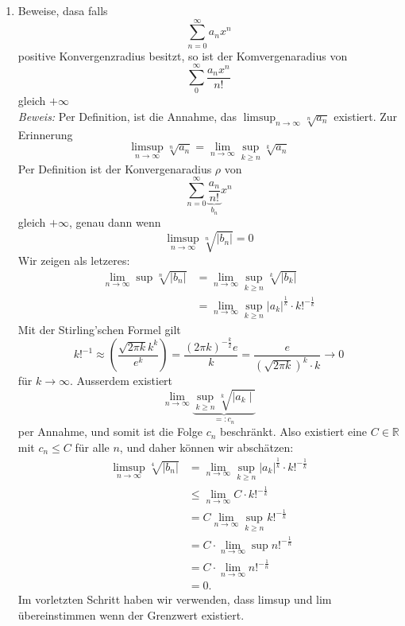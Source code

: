 \documentclass[a4paper,8pt]{extarticle}
\begin{document}
\begin{enumerate}
\item Beweise, dasa falls
$$
\sum_{n=0}^\infty a_nx^n
$$
positive Konvergenzradius besitzt, so ist der Komvergenaradius von
$$
\sum_{0}^{\infty} \frac{a_{n} x^{n}}{n !}
$$
gleich $+\infty$ \\
\textit{Beweis:} Per Definition, ist die Annahme, das $\limsup_{n \to \infty} \sqrt[n]{a_n}$
existiert. Zur Erinnerung
$$\limsup_{n \to \infty} \sqrt[n]{a_n} = \lim_{n \to \infty} \sup_{k \geq n} \sqrt[k]{a_n}$$
Per Definition ist der Konvergenaradius $\rho$ von
$$
\sum_{n=0}^{\infty} \underbrace{\frac{a_{n}}{n !}}_{b_{n}} x^{n}
$$
gleich $+\infty$, genau dann wenn
$$
\limsup_{n \to \infty} \sqrt[n]{\left|b_{n}\right|}=0
$$
Wir zeigen als letzeres:
$$
\begin{aligned}
  \lim _{n \rightarrow \infty} \sup \sqrt[n]{\left|b_{n}\right|} &=\lim _{n \rightarrow \infty} \sup _{k \geq n} \sqrt[k]{\left|b_{k}\right|} \\
  &=\lim _{n \rightarrow \infty} \sup _{k \geq n}\left|a_{k}\right|^{\frac{1}{k}} \cdot k !^{-\frac{1}{k}}
  \end{aligned}
$$
Mit der Stirling'schen Formel gilt
$$
k !^{-1} \approx\left(\frac{\sqrt{2 \pi k} k^{k}}{e^{k}}\right)=\frac{(2 \pi k)^{-\frac{k}{2}} e}{k}=\frac{e}{(\sqrt{2 \pi k})^{k} \cdot k} \rightarrow 0
$$
für $k \rightarrow \infty$. Ausserdem existiert
$$
\lim_{n \to \infty}\underbrace{\sup_{k \geq n} \sqrt[k]{\mid a_{k}\mid}}_{=:c_n}
$$
per Annahme, und somit ist die Folge $c_{n}$ beschränkt. Also existiert eine $C \in \mathbb{R}$ mit $c_{n} \leq C$ für alle $n$, und daher können wir abschätzen:
$$
\begin{aligned}
  \limsup _{n \rightarrow \infty} \sqrt[4]{\left|b_{n}\right|} &=\lim _{n \rightarrow \infty} \sup _{k \geq n}\left|a_{k}\right|^{\frac{1}{k}} \cdot k !^{-\frac{1}{k}} \\
  & \leq \lim _{n \rightarrow \infty} C \cdot k !^{-\frac{1}{k}} \\
  &=C \lim _{n \rightarrow \infty} \sup _{k \geq n} k !^{-\frac{1}{k}} \\
  &=C \cdot \lim _{n \rightarrow \infty} \sup n !^{-\frac{1}{n}} \\
  &=C \cdot \lim _{n \rightarrow \infty} n !^{-\frac{1}{n}} \\
  &=0 .
  \end{aligned}
  $$
Im vorletzten Schritt haben wir verwenden, dass limsup und lim übereinstimmen wenn der Grenzwert existiert.
\end{enumerate}
\end{document}
